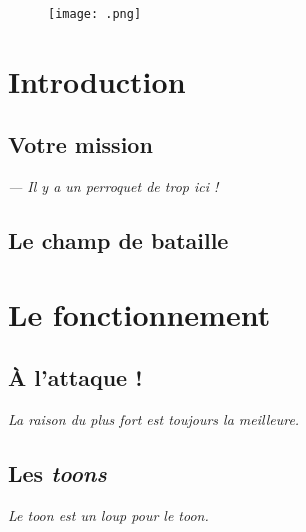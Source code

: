     \vspace{1cm}
    \begin{figure}[!h]
    \centering
    \texttt{[image: .png]}
    \caption{}
    \end{figure}
\fi



\section{Introduction}

\newpage

\subsection{Votre mission}
\textit{--- Il y a un perroquet de trop ici !}

\subsection{Le champ de bataille}

\newpage

\section{Le fonctionnement}
\subsection{À l'attaque !}

\emph{La raison du plus fort est toujours la meilleure.}


\subsection{Les \textit{toons}}
\textit{Le toon est un loup pour le toon.}

